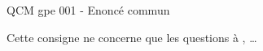 \begin{EnonceCommunQCM}    
    QCM gpe 001 - Enoncé commun

    Cette consigne ne concerne que les questions  à , \ldots
\end{EnonceCommunQCM}

